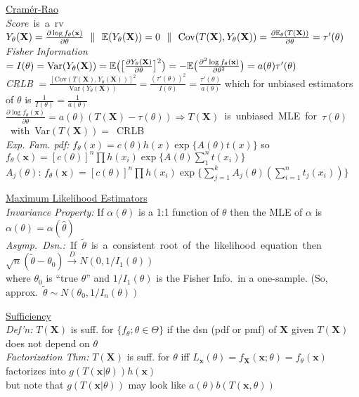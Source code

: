 \documentclass[11pt]{article}
\newcommand{\Var}{\ensuremath{\mathrm{Var}}}
\newcommand{\Cov}{\ensuremath{\mathrm{Cov}}}
\newcommand{\vecX}{\ensuremath{\mathbf{X}}}
\newcommand{\vecx}{\ensuremath{\mathbf{x}}}
\newcommand{\Exp}{\Bbb{E}}
\begin{document}
\indent \underline{Cram\'{e}r-Rao}\\
\mbox{{\it Score} is a rv $Y_\theta (\vecX) = \frac{\partial \log f_\theta
(\vecx)}{\partial\theta}\
\ 
%
\| \ \ \Exp(Y_\theta (\vecX))=0 \ \ 
%
\| \ \ \Cov(T(\vecX),Y_\theta (\vecX)) = \frac{\partial \Exp_\theta(T(\vecX))}{\partial\theta}
=
\tau '(\theta)$}\\
%
{\it Fisher Information}$= I(\theta) = \Var(Y_\theta (\vecX)) = \Exp\bigl(\bigl[\frac{\partial
Y_\theta (\vecX)}{\partial\theta}\bigr]^2\bigr) = -\Exp\bigl(\frac{\partial^2 \log f_\theta
(\vecx)}{\partial\theta^2}\bigr)=a(\theta)\tau '(\theta)$\\
%
{\it CRLB} $=\frac{[\Cov(T(\vecX),Y_\theta (\vecX))]^2}{\Var(Y_\theta (\vecX))} = \frac{(\tau
'(\theta))^2}{I(\theta)} =
\frac{\tau '(\theta)}{a(\theta)}$ which for unbiased estimators of $\theta$ is $
\frac{1}{I(\theta)} = \frac{1}{a(\theta )}$ \\
\mbox{$\frac{\partial \log f_\theta
(\vecx)}{\partial\theta} =a(\theta)(T(\vecX) - \tau(\theta)) \Longrightarrow
T(\vecX)$ is unbiased MLE for $\tau(\theta)$ with Var$(T(\vecX)) = $ CRLB}\\
%
{\it Exp. Fam. pdf:} $f_\theta (x)= c(\theta)h(x)\exp\{A(\theta)t(x)\}$ so $f_\theta
(\mathbf{x})= [c(\theta)]^n\prod h(x_i)\exp\{A(\theta)\sum_1^nt(x_i)\}$\\
\hspace{1.5em}{\it With k natural parameters} $A_j(\theta)$: $f_\theta
(\mathbf{x})= [c(\theta)]^n\prod h(x_i)\exp\{\sum_{j=1}^k
A_j(\theta)(\sum_{i=1}^nt_j(x_i))\}$


\indent\underline{Maximum Likelihood Estimators}\\
{\it Invariance Property:}  If $\alpha(\theta)$ is a 1:1 function of $\theta$ then the MLE
of $\alpha$ is
$\widehat{\alpha(\theta)} = \alpha(\hat{\theta})$\\
\mbox{{\it Asymp.\ Dsn.:} If $\tilde{\theta}$ is a consistent root of the likelihood equation
then 
$\sqrt{n}(\tilde{\theta} - \theta_0)\stackrel{D}{\longrightarrow}
N(0,1/I_1(\theta))$}\\
where $\theta_0$ is ``true $\theta$'' and $1/I_1(\theta)$ is the
Fisher Info.\  in a one-sample.  (So, approx.\ $\tilde{\theta} \sim N\left(\theta_0,
1/I_n(\theta)\right)$

\indent\underline{Sufficiency}\\
{\it Def'n:} $T(\mathbf{X})$ is suff. for $\{f_\theta ; \theta \in \Theta\}$ if the
dsn (pdf or pmf) of $\mathbf{X}$ given $T(\mathbf{X})$ does not depend on
$\theta$\\
%
{\it Factorization Thm:} $T(\mathbf{X})$  is suff. for $\theta$ iff $L_{\mathbf{x}}(\theta)
= f_{\mathbf{X}}(\mathbf{x}; \theta) = f_\theta(\mathbf{x})$ factorizes into
$g(T(\mathbf{x}|\theta))h(\mathbf{x})$\\
\hspace*{1.5em} but note that $g(T(\mathbf{x}|\theta))$ may look like
$a(\theta)b(T(\mathbf{x},\theta))$
\end{document}
